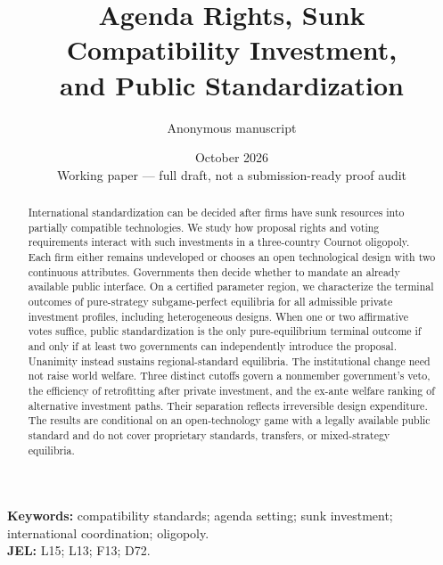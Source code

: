 \documentclass[11pt,a4paper]{article}
\title{\textbf{Agenda Rights, Sunk Compatibility Investment,\\ and Public Standardization}}
\author{Anonymous manuscript}
\date{October 2026\\\small Working paper --- full draft, not a submission-ready proof audit}
\theoremstyle{definition}\newtheorem{assumption}{Assumption}
\numberwithin{equation}{section}
\newcommand{\1}{\mathbf{1}}
\begin{document}
\maketitle
\begin{abstract}
International standardization can be decided after firms have sunk resources into partially compatible technologies. We study how proposal rights and voting requirements interact with such investments in a three-country Cournot oligopoly. Each firm either remains undeveloped or chooses an open technological design with two continuous attributes. Governments then decide whether to mandate an already available public interface. On a certified parameter region, we characterize the terminal outcomes of pure-strategy subgame-perfect equilibria for all admissible private investment profiles, including heterogeneous designs. When one or two affirmative votes suffice, public standardization is the only pure-equilibrium terminal outcome if and only if at least two governments can independently introduce the proposal. Unanimity instead sustains regional-standard equilibria. The institutional change need not raise world welfare. Three distinct cutoffs govern a nonmember government's veto, the efficiency of retrofitting after private investment, and the ex-ante welfare ranking of alternative investment paths. Their separation reflects irreversible design expenditure. The results are conditional on an open-technology game with a legally available public standard and do not cover proprietary standards, transfers, or mixed-strategy equilibria.
\end{abstract}
\noindent\textbf{Keywords:} compatibility standards; agenda setting; sunk investment; international coordination; oligopoly.\\
\noindent\textbf{JEL:} L15; L13; F13; D72.
\bigskip








\clearpage


\clearpage
\appendix


\end{document}
